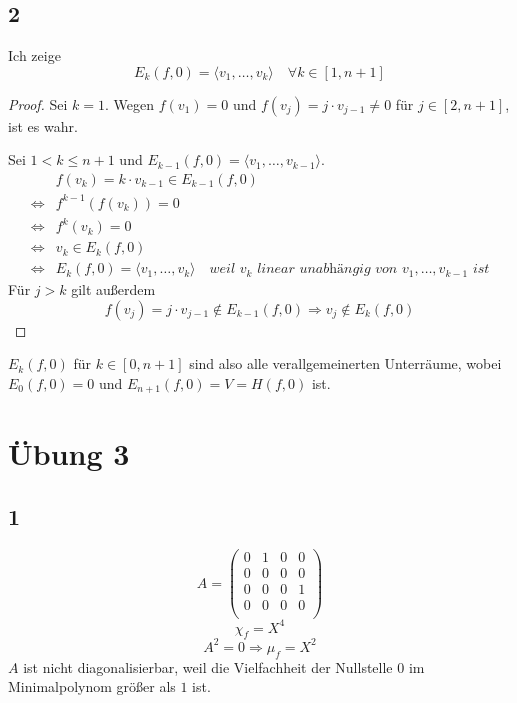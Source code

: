 \documentclass[10pt,a4paper]{article}
\begin{document}
\subsection*{2}

Ich zeige
\begin{equation}
E_{k}(f, 0) = \langle v_{1}, \dots, v_{k} \rangle \quad \forall k \in [1, n + 1]
\end{equation}

\begin{proof}
Sei $k = 1$.
Wegen $f(v_1) = 0$ und $f(v_{j}) = j \cdot v_{j - 1} \ne 0$ für $j \in [2, n + 1]$, ist es wahr.

Sei $1 < k \le n + 1$ und $E_{k - 1}(f, 0) = \langle v_{1}, \dots, v_{k - 1} \rangle$.
\begin{align}
& f(v_{k}) = k \cdot v_{k - 1} \in E_{k - 1}(f, 0)\\
\Leftrightarrow & f^{k - 1}(f(v_{k})) = 0\\
\Leftrightarrow & f^{k}(v_{k}) = 0\\
\Leftrightarrow & v_{k} \in E_{k}(f, 0)\\
\Leftrightarrow & E_{k}(f, 0) = \langle v_{1}, \dots, v_{k} \rangle \quad \textit{weil $v_{k}$ linear unabhängig von $v_{1}, \dots, v_{k - 1}$ ist}
\end{align}
Für $j > k$ gilt außerdem
\begin{equation}
f(v_{j}) = j \cdot v_{j - 1} \notin E_{k - 1}(f, 0) \Rightarrow v_{j} \notin E_{k}(f, 0)
\end{equation}
\end{proof}

$E_{k}(f, 0)$ für $k \in [0, n + 1]$ sind also alle verallgemeinerten Unterräume, wobei $E_{0}(f, 0) = 0$ und $E_{n + 1}(f, 0) = V = H(f, 0)$ ist.

\section*{Übung 3}

\subsection*{1}

\begin{equation}
A = 
\begin{pmatrix}
0 & 1 & 0 & 0\\
0 & 0 & 0 & 0\\
0 & 0 & 0 & 1\\
0 & 0 & 0 & 0\\
\end{pmatrix}
\end{equation}
\begin{equation}
\chi_{f} = X^{4}
\end{equation}
\begin{equation}
A^{2} = 0 \Rightarrow \mu_{f} = X^{2}
\end{equation}
$A$ ist nicht diagonalisierbar, weil die Vielfachheit der Nullstelle $0$ im Minimalpolynom größer als $1$ ist.
\end{document}
